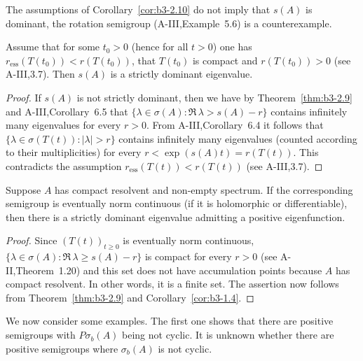 The assumptions of Corollary~\ref{cor:b3-2.10} do not imply that $s(A)$ is dominant, the rotation semigroup (A-III,Example~5.6) is a counterexample.
\begin{corollary}\label{cor:b3-2.11}
	Assume that for some $t_{0} > 0$ (hence for all $t > 0$) one has $r_{\text{ess}}(T(t_{0})) < r(T(t_{0}))$, \eg that $T(t_{0})$ is compact and $r(T(t_{0})) > 0$ (see A-III,3.7).
	Then $s(A)$ is a strictly dominant eigenvalue.
\end{corollary}
%
%	
\begin{proof}
	If $s(A)$ is not strictly dominant, then we have by Theorem~\ref{thm:b3-2.9} and A-III,Corollary~6.5 that $\{\lambda \in \sigma(A) \colon \Re\,\lambda  > s(A) - r\}$ contains infinitely many eigenvalues for every $r > 0$.
	From A-III,Corollary~6.4 it follows that $\{\lambda \in \sigma(T(t)) \colon |\lambda| > r\}$ contains infinitely many eigenvalues (counted according to their multiplicities) for every $r < \exp(s(A)t) = r(T(t))$.
	This contradicts the assumption $r_{\text{ess}}(T(t)) < r(T(t))$ (see A-III,3.7).
\end{proof}
\begin{corollary}\label{cor:b3-2.12}
	Suppose $A$ has compact resolvent and non-empty spectrum.
	If the corresponding semigroup is eventually norm continuous (\eg if it is holomorphic or differentiable), then there is a strictly dominant eigenvalue admitting a positive eigenfunction.
\end{corollary}
\begin{proof}
	Since $(T(t))_{t \geq 0}$ is eventually norm continuous, $\{\lambda \in \sigma(A) \colon \Re\,\lambda  \geq s(A)-r\}$ is compact for every $r > 0$ (see A-II,Theorem~1.20) and this set does not have accumulation points because $A$ has compact resolvent.
	In other words, it is a finite set.
	The assertion now follows from Theorem~\ref{thm:b3-2.9} and Corollary~\ref{cor:b3-1.4}.
\end{proof}
We now consider some examples. 
The first one shows that there are positive semigroups with $P\sigma_{b}(A)$ being not cyclic.
It is unknown whether there are positive semigroups where $\sigma_{b}(A)$ is not cyclic.
